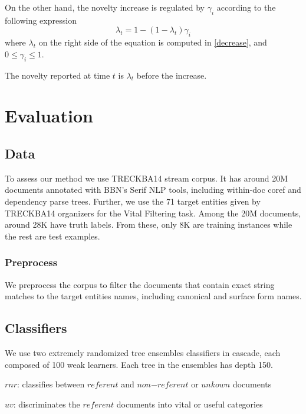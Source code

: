 \documentclass{article}
\begin{document}
On the other hand, the novelty increase is regulated by $\gamma_i$ according to the following expression
\begin{equation}
\lambda_t = 1 - (1 - \lambda_t) \gamma_i
\end{equation}
where $\lambda_t$ on the right side of the equation is computed in \ref{decrease}, and $0 \leq \gamma_i \leq 1$.

The novelty reported at time $t$ is $\lambda_t$ before the increase.

\section{Evaluation}
\label{evaluation}

\subsection{Data}

To assess our method we use TRECKBA14 stream corpus. It has around 20M documents annotated with BBN's Serif NLP tools, including within-doc coref and dependency parse trees. Further, we use the 71 target entities given by TRECKBA14 organizers for the Vital Filtering task. Among the 20M documents, around 28K have truth labels. From these, only 8K are training instances while the rest are test examples.

\subsubsection{Preprocess}

We preprocess the corpus to filter the documents that contain exact string matches to the target entities names, including canonical and surface form names.

\subsection{Classifiers}

We use two extremely randomized tree ensembles classifiers \cite{GEW06a} in cascade, each composed of 100 weak learners. Each tree in the ensembles has depth 150.

\begin{itemize*}
    \item $rnr$: classifies between $referent$ and $non\mathord{-}referent$ or $unkown$ documents
    \item $uv$: discriminates the $referent$ documents into vital or useful categories
\end{itemize*}
\end{document}
